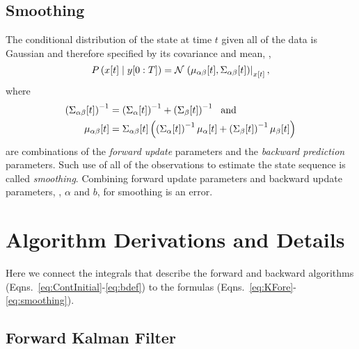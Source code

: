 \subsection{Smoothing}

The conditional distribution of the state at time $t$ given all of the
data is Gaussian and therefore specified by its covariance and mean, \ie,
\begin{equation*}
   P \left({x}{[t]}\mid y[0:T] \right) = {\mathcal{N}}\left.\left({\mu_{\alpha
   \beta}}{[t]},{\Sigma_{\alpha \beta}}{[t]}\right)\right|_{{x}{[t]}},
\end{equation*}
where
\begin{subequations}
  \label{eq:smoothing}
  \begin{align}
    \left( {\Sigma_{\alpha \beta}}{[t]} \right)^{-1} &= \left(
      {\Sigma_{\alpha}}{[t]} \right)^{-1} + \left(
      {\Sigma_{\beta}}{[t]} \right)^{-1} ~\text{ and} \\
    {\mu_{\alpha \beta}}{[t]} &=
    {\Sigma_{\alpha \beta}}{[t]} \left( \left(
        {\Sigma_{\alpha}}{[t]} \right)^{-1} {\mu_{\alpha}}{[t]} +
      \left( {\Sigma_{\beta}}{[t]} \right)^{-1} {\mu_{\beta}}{[t]}
    \right)
\end{align}
\end{subequations}
are combinations of the \emph{forward update} parameters and the
\emph{backward prediction} parameters.  Such use of all of the
observations to estimate the state sequence is called
\emph{smoothing}.  Combining forward update parameters and backward
update parameters, \ie, $\alpha$ and $b$, for smoothing is an error.

\section{Algorithm Derivations and Details}
\label{sec:KDerive}

Here we connect the integrals that describe the forward and backward
algorithms (Eqns.~\eqref{eq:ContInitial}-\eqref{eq:bdef}) to the
formulas (Eqns.~\eqref{eq:KFore}-\eqref{eq:smoothing}).

\subsection{Forward Kalman Filter}
\label{sec:DetailForward}

